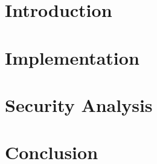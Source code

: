 

\chapter{Introduction}\label{chapter:introduction}


\chapter{Implementation}\label{chapter:method}


\chapter{Security Analysis}\label{chapter:results}


\chapter{Conclusion}\label{chapter:discussion}


